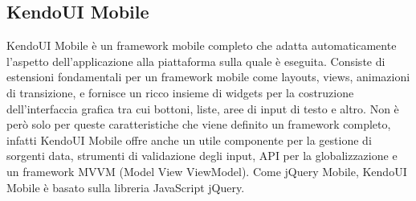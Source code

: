 		\subsection{KendoUI Mobile}
			KendoUI Mobile è un framework mobile completo che adatta
			automaticamente	l'aspetto dell'applicazione alla piattaforma sulla
			quale è eseguita. Consiste di estensioni fondamentali per un
			framework mobile come layouts, views, animazioni di transizione,
			e fornisce un ricco insieme di widgets per la costruzione
			dell'interfaccia grafica tra cui bottoni, liste, aree di input di
			testo e altro. Non è però solo per queste caratteristiche che viene
			definito un framework completo, infatti KendoUI Mobile offre anche
			un utile componente per la gestione di sorgenti data, strumenti di
			validazione degli input, API per la globalizzazione e un framework
			MVVM (Model View ViewModel). Come jQuery Mobile, KendoUI Mobile è
			basato sulla libreria JavaScript jQuery.
			
